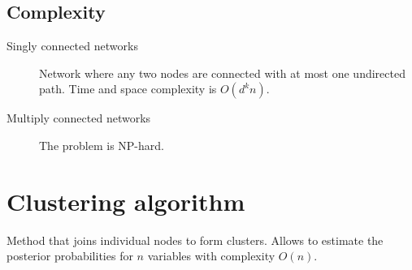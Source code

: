 \subsection{Complexity}
\begin{description}
    \item[Singly connected networks] 
        Network where any two nodes are connected with at most one undirected path.
        Time and space complexity is $O(d^k n)$.
    \item[Multiply connected networks] The problem is NP-hard.
\end{description}


\section{Clustering algorithm}

Method that joins individual nodes to form clusters.
Allows to estimate the posterior probabilities for $n$ variables with complexity $O(n)$.